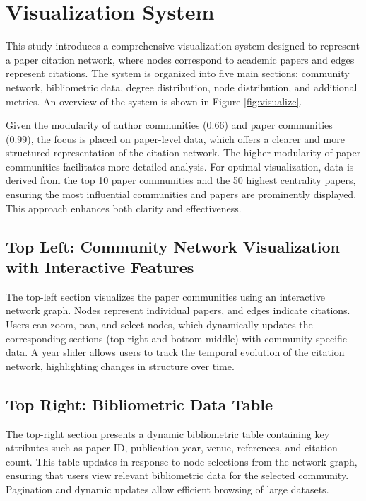 \documentclass[11pt]{article}
\begin{document}
\section{Visualization System}

This study introduces a comprehensive visualization system designed to represent a paper citation network, where nodes correspond to academic papers and edges represent citations. The system is organized into five main sections: community network, bibliometric data, degree distribution, node distribution, and additional metrics. An overview of the system is shown in Figure \ref{fig:visualize}.

Given the modularity of author communities (0.66) and paper communities (0.99), the focus is placed on paper-level data, which offers a clearer and more structured representation of the citation network. The higher modularity of paper communities facilitates more detailed analysis. For optimal visualization, data is derived from the top 10 paper communities and the 50 highest centrality papers, ensuring the most influential communities and papers are prominently displayed. This approach enhances both clarity and effectiveness.

\subsection{Top Left: Community Network Visualization with Interactive Features}

The top-left section visualizes the paper communities using an interactive network graph. Nodes represent individual papers, and edges indicate citations. Users can zoom, pan, and select nodes, which dynamically updates the corresponding sections (top-right and bottom-middle) with community-specific data. A year slider allows users to track the temporal evolution of the citation network, highlighting changes in structure over time.

\subsection{Top Right: Bibliometric Data Table}

The top-right section presents a dynamic bibliometric table containing key attributes such as paper ID, publication year, venue, references, and citation count. This table updates in response to node selections from the network graph, ensuring that users view relevant bibliometric data for the selected community. Pagination and dynamic updates allow efficient browsing of large datasets.
\end{document}
